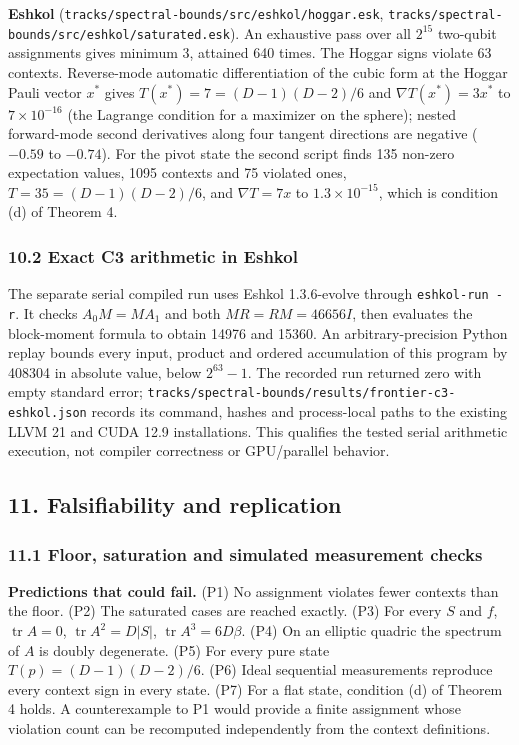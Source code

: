 \documentclass[11pt,a4paper]{article}
\begin{document}
\textbf{Eshkol} (\nolinkurl{tracks/spectral-bounds/src/eshkol/hoggar.esk}, \nolinkurl{tracks/spectral-bounds/src/eshkol/saturated.esk}). An exhaustive pass over all \(2^{15}\)
two-qubit assignments gives minimum 3, attained 640 times. The Hoggar signs violate 63 contexts.
Reverse-mode automatic differentiation of the cubic form at the Hoggar Pauli vector \(x^\ast\) gives
\(T(x^\ast) = 7 = (D-1)(D-2)/6\) and \(\nabla T(x^\ast) = 3x^\ast\) to \(7\times10^{-16}\) (the Lagrange condition
for a maximizer on the sphere); nested forward-mode second derivatives along four tangent directions are
negative (\(-0.59\) to \(-0.74\)). For the pivot state the second script finds 135 non-zero expectation
values, 1095 contexts and 75 violated ones, \(T = 35 = (D-1)(D-2)/6\), and \(\nabla T = 7x\) to
\(1.3\times10^{-15}\), which is condition (d) of Theorem 4.

\subsubsection{10.2 Exact C3 arithmetic in Eshkol}\label{102-exact-c3-arithmetic-in-eshkol}

The separate serial compiled run uses Eshkol 1.3.6-evolve through
\texttt{eshkol-run\ -r}. It checks \(A_0M=MA_1\) and both \(MR=RM=46656I\), then evaluates the block-moment
formula to obtain 14976 and 15360. An arbitrary-precision Python replay bounds every input, product
and ordered accumulation of this program by 408304 in absolute value, below \(2^{63}-1\). The recorded
run returned zero with empty standard error; \nolinkurl{tracks/spectral-bounds/results/frontier-c3-eshkol.json} records its command,
hashes and process-local paths to the existing LLVM 21 and CUDA 12.9 installations. This qualifies
the tested serial arithmetic execution, not compiler correctness or GPU/parallel behavior.

\subsection{11. Falsifiability and replication}\label{11-falsifiability-and-replication}

\subsubsection{11.1 Floor, saturation and simulated measurement checks}\label{111-floor-saturation-and-simulated-measurement-checks}

\textbf{Predictions that could fail.} (P1) No assignment violates fewer contexts than the floor. (P2) The
saturated cases are reached exactly. (P3) For every \(S\) and \(f\), \(\operatorname{tr}A = 0\),
\(\operatorname{tr}A^2 = D|S|\), \(\operatorname{tr}A^3 = 6D\beta\). (P4) On an elliptic quadric the spectrum of
\(A\) is doubly degenerate. (P5) For every pure state \(T(p) = (D-1)(D-2)/6\). (P6) Ideal sequential
measurements reproduce every context sign in every state. (P7) For a flat state, condition (d) of
Theorem 4 holds. A counterexample to P1 would provide a finite assignment whose violation count can
be recomputed independently from the context definitions.
\end{document}
